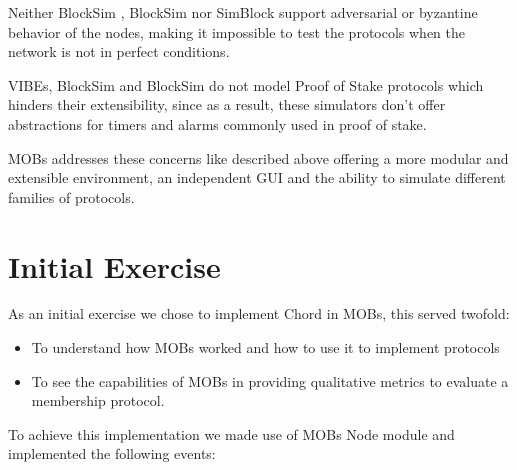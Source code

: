 Neither BlockSim \cite{blocksim1}, BlockSim \cite{blocksim2} nor SimBlock \cite{simblock} 
support adversarial or byzantine behavior
of the nodes, making it impossible to test the protocols when the network is not in
perfect conditions.

VIBEs, BlockSim and BlockSim do not model Proof of Stake protocols which hinders
their extensibility, since as a result, these simulators don't offer abstractions
for timers and alarms commonly used in proof of stake.

MOBs addresses these concerns like described above offering a more modular and extensible
environment, an independent GUI and the ability to simulate different families of protocols.

\section{Initial Exercise}
\label{sub:initial_exercise}

As an initial exercise we chose to implement Chord in MOBs, this served twofold:

\begin{itemize}
  \item To understand how MOBs worked and how to use it to implement protocols
  \item To see the capabilities of MOBs in providing qualitative metrics to evaluate
a membership protocol.
\end{itemize}

To achieve this implementation we made use of MOBs Node module and implemented the
following events:


